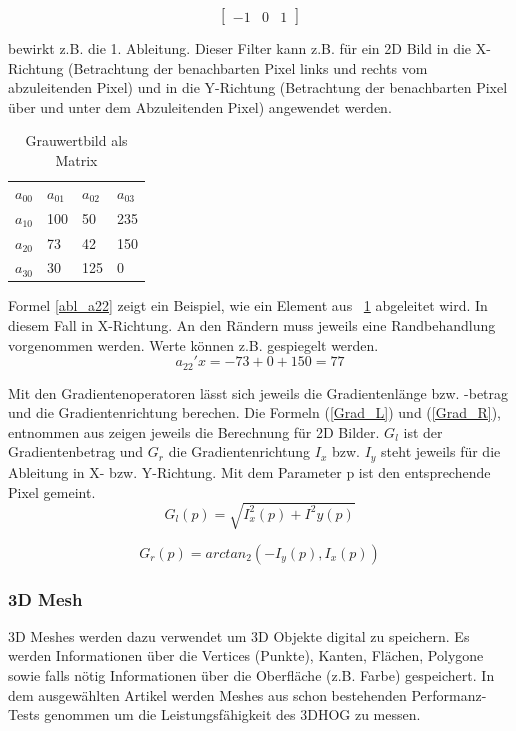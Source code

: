\begin{equation}
\label{Abl_Maske}
\begin{bmatrix}
-1 & 0 & 1
\end{bmatrix}
\end{equation}

bewirkt z.B. die 1. Ableitung. Dieser Filter kann z.B. für ein 2D Bild in die X-Richtung (Betrachtung der benachbarten Pixel links und rechts vom abzuleitenden Pixel) und in die Y-Richtung (Betrachtung der benachbarten Pixel über und unter dem Abzuleitenden Pixel) angewendet werden.  

\begin{table}[]
	\centering
	\caption{Grauwertbild als Matrix}
	\label{GrauwertMat}
	\begin{tabular}{llll}
		$a_{00}$ & $a_{01}$ & $a_{02}$ & $a_{03}$ \\
		$a_{10}$ & 100    & 50     & 235     \\
		$a_{20}$ & 73     & 42     & 150      \\
		$a_{30}$ & 30     & 125    & 0                     
	\end{tabular}
\end{table}

Formel \ref{abl_a22} zeigt ein Beispiel, wie ein Element aus \tablename~\ref{GrauwertMat} abgeleitet wird. In diesem Fall in X-Richtung. An den Rändern muss jeweils eine Randbehandlung vorgenommen werden. Werte können z.B. gespiegelt werden.
\begin{equation}
\label{abl_a22}
a_{22}'x = -73 + 0 +150 = 77
\end{equation}

Mit den Gradientenoperatoren lässt sich jeweils die Gradientenlänge bzw. -betrag und die Gradientenrichtung berechen. Die Formeln (\ref{Grad_L}) und (\ref{Grad_R}), entnommen aus \cite{Priese15} zeigen jeweils die Berechnung für 2D Bilder. $G_l$ ist der Gradientenbetrag und $G_r$ die Gradientenrichtung $I_x$ bzw. $I_y$ steht jeweils für die Ableitung in X- bzw. Y-Richtung. Mit dem Parameter p ist den entsprechende Pixel gemeint.
\begin{equation}
\label{Grad_L}
G_l(p) = \sqrt{I^2_x(p)+ I^2 y(p)}
\end{equation}

\begin{equation}
\label{Grad_R}
G_r(p) = arctan_2(- I_y(p),I_x(p))
\end{equation}


\subsubsection{3D Mesh}
3D Meshes werden dazu verwendet um 3D Objekte digital zu speichern. Es werden Informationen über die Vertices (Punkte), Kanten, Flächen, Polygone sowie falls nötig Informationen über die Oberfläche (z.B. Farbe) gespeichert. In dem ausgewählten Artikel \cite{scherer2010histograms} werden Meshes aus schon bestehenden Performanz-Tests genommen um die Leistungsfähigkeit des 3DHOG zu messen.